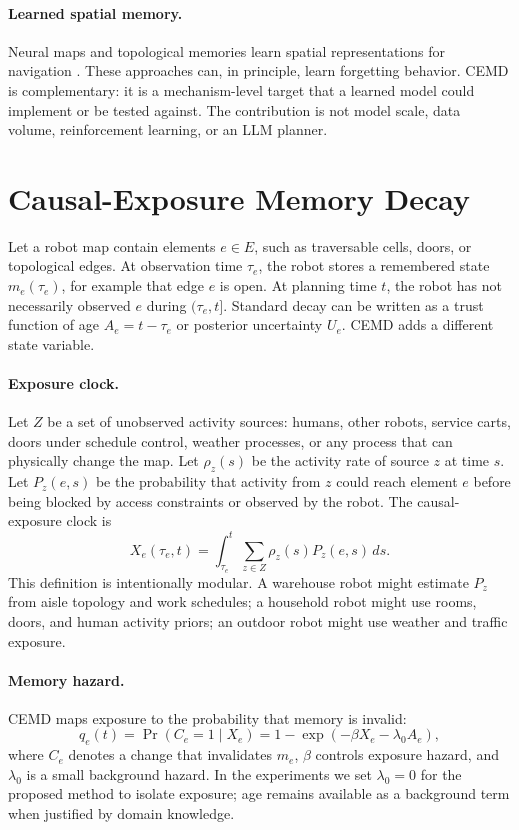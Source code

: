 \documentclass{article}
\begin{document}
\paragraph{Learned spatial memory.}
Neural maps and topological memories learn spatial representations for navigation \citep{gupta2017cognitive,parisotto2018neural,savinov2018semi,chaplot2020neural}. These approaches can, in principle, learn forgetting behavior. CEMD is complementary: it is a mechanism-level target that a learned model could implement or be tested against. The contribution is not model scale, data volume, reinforcement learning, or an LLM planner.

\section{Causal-Exposure Memory Decay}

Let a robot map contain elements $e \in E$, such as traversable cells, doors, or topological edges. At observation time $\tau_e$, the robot stores a remembered state $m_e(\tau_e)$, for example that edge $e$ is open. At planning time $t$, the robot has not necessarily observed $e$ during $(\tau_e,t]$. Standard decay can be written as a trust function of age $A_e=t-\tau_e$ or posterior uncertainty $U_e$. CEMD adds a different state variable.

\paragraph{Exposure clock.}
Let $Z$ be a set of unobserved activity sources: humans, other robots, service carts, doors under schedule control, weather processes, or any process that can physically change the map. Let $\rho_z(s)$ be the activity rate of source $z$ at time $s$. Let $P_z(e,s)$ be the probability that activity from $z$ could reach element $e$ before being blocked by access constraints or observed by the robot. The causal-exposure clock is
\begin{equation}
X_e(\tau_e,t) =
\int_{\tau_e}^{t} \sum_{z \in Z} \rho_z(s) P_z(e,s) \, ds .
\end{equation}
This definition is intentionally modular. A warehouse robot might estimate $P_z$ from aisle topology and work schedules; a household robot might use rooms, doors, and human activity priors; an outdoor robot might use weather and traffic exposure.

\paragraph{Memory hazard.}
CEMD maps exposure to the probability that memory is invalid:
\begin{equation}
q_e(t) = \Pr(C_e=1 \mid X_e) = 1 - \exp(-\beta X_e - \lambda_0 A_e),
\end{equation}
where $C_e$ denotes a change that invalidates $m_e$, $\beta$ controls exposure hazard, and $\lambda_0$ is a small background hazard. In the experiments we set $\lambda_0=0$ for the proposed method to isolate exposure; age remains available as a background term when justified by domain knowledge.
\end{document}
